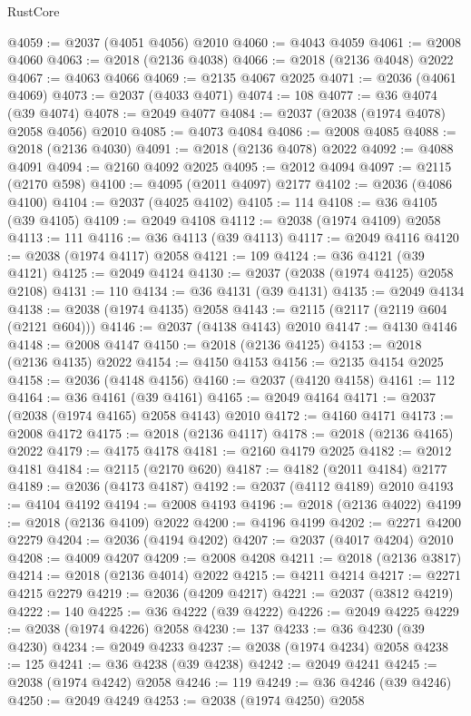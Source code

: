 \begin{lexlean}{RustCore}
\begin{coremodule}
@4059 := @2037 (@4051 @4056) @2010
@4060 := @4043 @4059
@4061 := @2008 @4060
@4063 := @2018 (@2136 @4038)
@4066 := @2018 (@2136 @4048) @2022
@4067 := @4063 @4066
@4069 := @2135 @4067 @2025
@4071 := @2036 (@4061 @4069)
@4073 := @2037 (@4033 @4071)
@4074 := 108
@4077 := @36 @4074 (@39 @4074)
@4078 := @2049 @4077
@4084 := @2037 (@2038 (@1974 @4078) @2058 @4056) @2010
@4085 := @4073 @4084
@4086 := @2008 @4085
@4088 := @2018 (@2136 @4030)
@4091 := @2018 (@2136 @4078) @2022
@4092 := @4088 @4091
@4094 := @2160 @4092 @2025
@4095 := @2012 @4094
@4097 := @2115 (@2170 @598)
@4100 := @4095 (@2011 @4097) @2177
@4102 := @2036 (@4086 @4100)
@4104 := @2037 (@4025 @4102)
@4105 := 114
@4108 := @36 @4105 (@39 @4105)
@4109 := @2049 @4108
@4112 := @2038 (@1974 @4109) @2058
@4113 := 111
@4116 := @36 @4113 (@39 @4113)
@4117 := @2049 @4116
@4120 := @2038 (@1974 @4117) @2058
@4121 := 109
@4124 := @36 @4121 (@39 @4121)
@4125 := @2049 @4124
@4130 := @2037 (@2038 (@1974 @4125) @2058 @2108)
@4131 := 110
@4134 := @36 @4131 (@39 @4131)
@4135 := @2049 @4134
@4138 := @2038 (@1974 @4135) @2058
@4143 := @2115 (@2117 (@2119 @604 (@2121 @604)))
@4146 := @2037 (@4138 @4143) @2010
@4147 := @4130 @4146
@4148 := @2008 @4147
@4150 := @2018 (@2136 @4125)
@4153 := @2018 (@2136 @4135) @2022
@4154 := @4150 @4153
@4156 := @2135 @4154 @2025
@4158 := @2036 (@4148 @4156)
@4160 := @2037 (@4120 @4158)
@4161 := 112
@4164 := @36 @4161 (@39 @4161)
@4165 := @2049 @4164
@4171 := @2037 (@2038 (@1974 @4165) @2058 @4143) @2010
@4172 := @4160 @4171
@4173 := @2008 @4172
@4175 := @2018 (@2136 @4117)
@4178 := @2018 (@2136 @4165) @2022
@4179 := @4175 @4178
@4181 := @2160 @4179 @2025
@4182 := @2012 @4181
@4184 := @2115 (@2170 @620)
@4187 := @4182 (@2011 @4184) @2177
@4189 := @2036 (@4173 @4187)
@4192 := @2037 (@4112 @4189) @2010
@4193 := @4104 @4192
@4194 := @2008 @4193
@4196 := @2018 (@2136 @4022)
@4199 := @2018 (@2136 @4109) @2022
@4200 := @4196 @4199
@4202 := @2271 @4200 @2279
@4204 := @2036 (@4194 @4202)
@4207 := @2037 (@4017 @4204) @2010
@4208 := @4009 @4207
@4209 := @2008 @4208
@4211 := @2018 (@2136 @3817)
@4214 := @2018 (@2136 @4014) @2022
@4215 := @4211 @4214
@4217 := @2271 @4215 @2279
@4219 := @2036 (@4209 @4217)
@4221 := @2037 (@3812 @4219)
@4222 := 140
@4225 := @36 @4222 (@39 @4222)
@4226 := @2049 @4225
@4229 := @2038 (@1974 @4226) @2058
@4230 := 137
@4233 := @36 @4230 (@39 @4230)
@4234 := @2049 @4233
@4237 := @2038 (@1974 @4234) @2058
@4238 := 125
@4241 := @36 @4238 (@39 @4238)
@4242 := @2049 @4241
@4245 := @2038 (@1974 @4242) @2058
@4246 := 119
@4249 := @36 @4246 (@39 @4246)
@4250 := @2049 @4249
@4253 := @2038 (@1974 @4250) @2058

\end{coremodule}
\end{lexlean}
